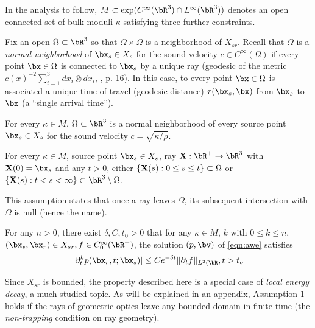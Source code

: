 In the analysis to follow, $M \subset \exp (C^{\infty}(\bR^3) \cap
L^{\infty}(\bR^3))$ denotes an open connected set of bulk moduli $\kappa$
satisfying three further constraints.

Fix an open $\Omega \subset \bR^3$ so that $\Omega \times \Omega$
is a neighborhood of $X_{sr}$. Recall that $\Omega$ is a {\em normal neighborhood} of
$\bx_s \in X_s$ for the sound velocity $c \in C^{\infty}(\Omega)$ if every point $\bx \in \Omega$ is connected to
$\bx_s$ by  a unique ray  (geodesic of the metric $c(x)^{-2}
\sum_{i=1}^3dx_i \otimes dx_i$, \cite{Friedlander:75},
p. 16). In this case, to every point $\bx \in \Omega$ is associated a
unique time of travel (geodesic distance) $\tau(\bx_s,\bx)$ from
$\bx_s$ to $\bx$ (a ``single arrival time'').
\begin{assumption}
  \label{thm:singlearrival} 
  For every $\kappa \in M$, $\Omega\subset \bR^3$ is a normal
  neighborhood of every source point $\bx_s\in X_{s}$ for the sound
  velocity $c=\sqrt{\kappa/\rho}$.
\end{assumption}

\begin{assumption}
  \label{thm:noreturn}
  For every $\kappa \in M$, source point $\bx_s \in X_{s}$, ray ${\bf X}:\bR^+\rightarrow \bR^3$
  with ${\bf X}(0)=\bx_s$ and any $t>0$, either $\{{\bf X}(s): 0\le s \le t\} \subset \Omega$
  or $\{{\bf X}(s): t < s < \infty\} \subset \bR^3 \setminus \Omega$.
\end{assumption}
This assumption states that once a ray leaves
$\Omega$, its subsequent intersection with $\Omega$ is null (hence the
name).

\begin{assumption}
  \label{thm:expdecay}
  For any $n > 0$, there
  exist $\delta, C, t_0 > 0$ that for any $\kappa \in M$, $k$ with $0 \le k \le n$,
  $(\bx_s,\bx_r) \in X_{sr}, f \in C_0^{\infty}(\bR^+)$, the solution
  $(p,\bv)$ of \ref{eqn:awe} satisfies
 \begin{equation}
   \label{eqn:expdec}
    |\partial_t^k p(\bx_r,t;\bx_s)| \le C e^{-\delta t}\|\partial_t
    f\|_{L^2(\bR}, t > t_o
  \end{equation}
\end{assumption}

Since $X_{sr}$ is bounded, the property described here
is a special case of {\em local energy decay}, a much studied
topic. As will be explained in an appendix, Assumption 1 holds if the
rays of geometric optics leave any bounded domain in finite time (the
{\em non-trapping} condition on ray geometry).


